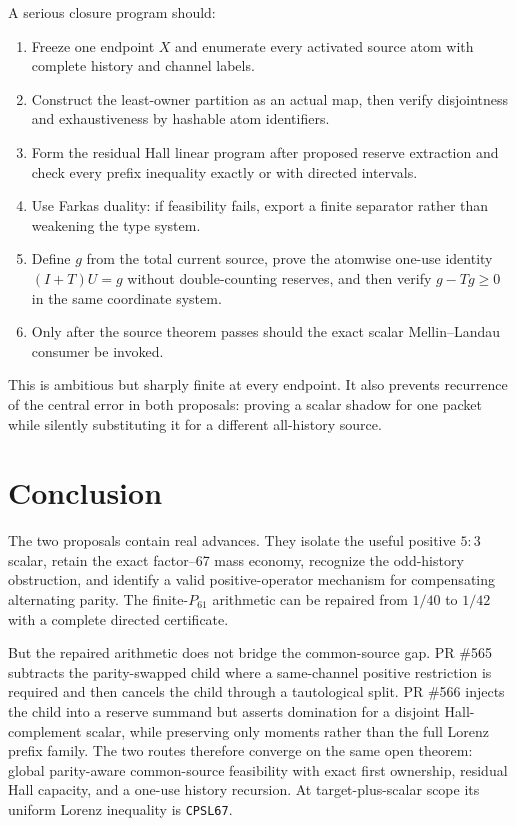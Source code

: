 \documentclass[11pt]{article}
\newcommand{\1}{\mathbf 1}
\begin{document}
A serious closure program should:
\begin{enumerate}
\item Freeze one endpoint $X$ and enumerate every activated source atom with complete history and channel labels.
\item Construct the least-owner partition as an actual map, then verify disjointness and exhaustiveness by hashable atom identifiers.
\item Form the residual Hall linear program after proposed reserve extraction and check every prefix inequality exactly or with directed intervals.
\item Use Farkas duality: if feasibility fails, export a finite separator rather than weakening the type system.
\item Define $g$ from the total current source, prove the atomwise one-use identity $(I+T)U=g$ without double-counting reserves, and then verify $g-Tg\ge0$ in the same coordinate system.
\item Only after the source theorem passes should the exact scalar Mellin--Landau consumer be invoked.
\end{enumerate}

This is ambitious but sharply finite at every endpoint.  It also prevents recurrence of the central error in both proposals: proving a scalar shadow for one packet while silently substituting it for a different all-history source.

\section{Conclusion}

The two proposals contain real advances.  They isolate the useful positive $5{:}3$ scalar, retain the exact factor--67 mass economy, recognize the odd-history obstruction, and identify a valid positive-operator mechanism for compensating alternating parity.  The finite-$P_{61}$ arithmetic can be repaired from $1/40$ to $1/42$ with a complete directed certificate.

But the repaired arithmetic does not bridge the common-source gap.  PR \#565 subtracts the parity-swapped child where a same-channel positive restriction is required and then cancels the child through a tautological split.  PR \#566 injects the child into a reserve summand but asserts domination for a disjoint Hall-complement scalar, while preserving only moments rather than the full Lorenz prefix family.  The two routes therefore converge on the same open theorem: global parity-aware common-source feasibility with exact first ownership, residual Hall capacity, and a one-use history recursion.  At target-plus-scalar scope its uniform Lorenz inequality is \texttt{CPSL67}.
\end{document}
